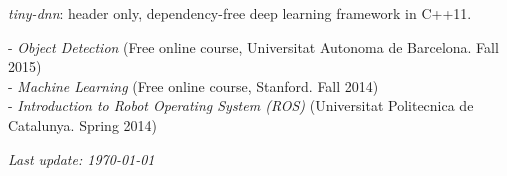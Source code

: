 \documentclass{article}
\begin{document}
\begin{llist}
{\em tiny-dnn}: header only, dependency-free deep learning framework in C++11.


%



\label{Relevant Coursework}
- \textit{Object Detection} (Free online course, Universitat Autonoma de Barcelona. Fall 2015)\\
- \textit{Machine Learning} (Free online course, Stanford. Fall 2014)\\
- \textit{Introduction to Robot Operating System (ROS)} (Universitat Politecnica de Catalunya. Spring 2014)

\label{Reference}


\end{llist}

{\em Last update: \today}
\end{document}
